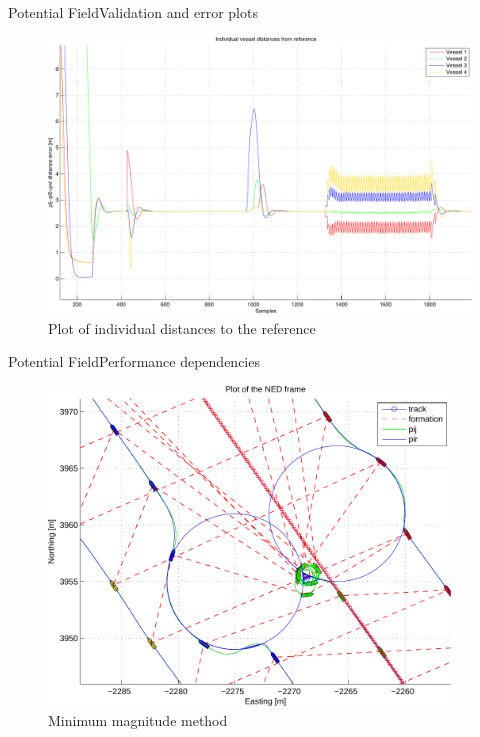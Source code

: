 \documentclass[10pt,handout]{beamer}
\begin{document}
\begin{frame}{Potential Field}{Validation and error plots}
  \begin{figure}
    \includegraphics[width=\textwidth]{img/pdfdistfromref}
    \caption{Plot of individual distances to the reference}
  \end{figure}
\end{frame}

\begin{frame}{Potential Field}{Performance dependencies}
  \begin{figure}
    \includegraphics[width=0.95\textwidth]{img/wp_gen_ass_fail}
    \caption{Minimum magnitude method}
  \end{figure}
\end{frame}
\end{document}

